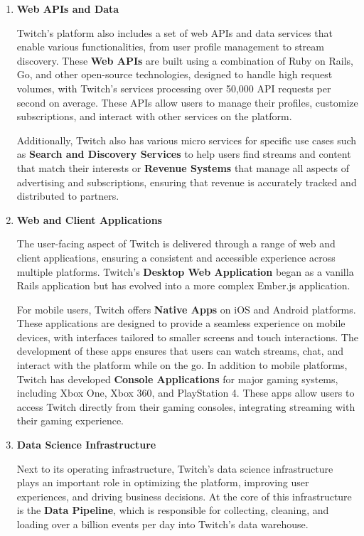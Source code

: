 \begin{enumerate}
    \item \textbf{Web \ac{API}s and Data}

    Twitch’s platform also includes a set of web \ac{API}s and data services that enable various functionalities, from user profile management to stream discovery. These \textbf{Web \ac{API}s} are built using a combination of Ruby on Rails, Go, and other open-source technologies, designed to handle high request volumes, with Twitch's services processing over 50,000 \ac{API} requests per second on average. These \ac{API}s allow users to manage their profiles, customize subscriptions, and interact with other services on the platform.

    Additionally, Twitch also has various micro services for specific use cases such as \textbf{Search and Discovery Services} to help users find streams and content that match their interests or \textbf{Revenue Systems} that manage all aspects of advertising and subscriptions, ensuring that revenue is accurately tracked and distributed to partners. 
    
    \item \textbf{Web and Client Applications}

    The user-facing aspect of Twitch is delivered through a range of web and client applications, ensuring a consistent and  accessible experience across multiple platforms. Twitch’s \textbf{Desktop Web Application} began as a vanilla Rails application but has evolved into a more complex Ember.js application.

    For mobile users, Twitch offers \textbf{Native Apps} on iOS and Android platforms. These applications are designed to provide a seamless experience on mobile devices, with interfaces tailored to smaller screens and touch interactions. The development of these apps ensures that users can watch streams, chat, and interact with the platform while on the go. In addition to mobile platforms, Twitch has developed \textbf{Console Applications} for major gaming systems, including Xbox One, Xbox 360, and PlayStation 4. These apps allow users to access Twitch directly from their gaming consoles, integrating streaming with their gaming experience.

    \item \textbf{Data Science Infrastructure}

    Next to its operating infrastructure, Twitch’s data science infrastructure plays an important role in optimizing the platform, improving user experiences, and driving business decisions. At the core of this infrastructure is the \textbf{Data Pipeline}, which is responsible for collecting, cleaning, and loading over a billion events per day into Twitch’s data warehouse. 


\end{enumerate}

